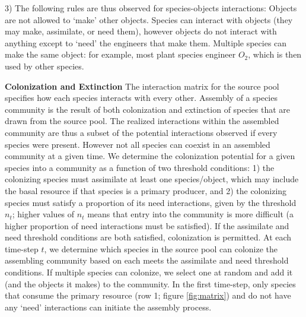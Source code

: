 \documentclass[twocolumn,preprintnumbers,amsmath,amssymb,superscriptaddress]{revtex4}
\begin{document}
3) The following rules are thus observed for species-objects interactions:
Objects are not allowed to `make' other objects.
Species can interact with objects (they may make, assimilate, or need them), however objects do not interact with anything except to `need' the engineers that make them.
Multiple species can make the same object: for example, most plant species engineer $O_2$, which is then used by other species.




\textbf{Colonization and Extinction} The interaction matrix for the source pool specifies how each species interacts with every other.
Assembly of a species community is the result of both colonization and extinction of species that are drawn from the source pool.
The realized interactions within the assembled community are thus a subset of the potential interactions observed if every species were present.
However not all species can coexist in an assembled community at a given time.
We determine the colonization potential for a given species into a community as a function of two threshold conditions:
1) the colonizing species must assimilate at least one species/object, which may include the basal resource if that species is a primary producer, and
2) the colonizing species must satisfy a proportion of its need interactions, given by the threshold $n_t$; higher values of $n_t$ means that entry into the community is more difficult (a higher proportion of need interactions must be satisfied).
If the assimilate and need threshold conditions are both satisfied, colonization is permitted.
At each time-step $t$, we determine which species in the source pool can colonize the assembling community based on each meets the assimilate and need threshold conditions.
If multiple species can colonize, we select one at random and add it (and the objects it makes) to the community.
In the first time-step, only species that consume the primary resource (row 1; figure \ref{fig:matrix}) and do not have any `need' interactions can initiate the assembly process.
\end{document}

